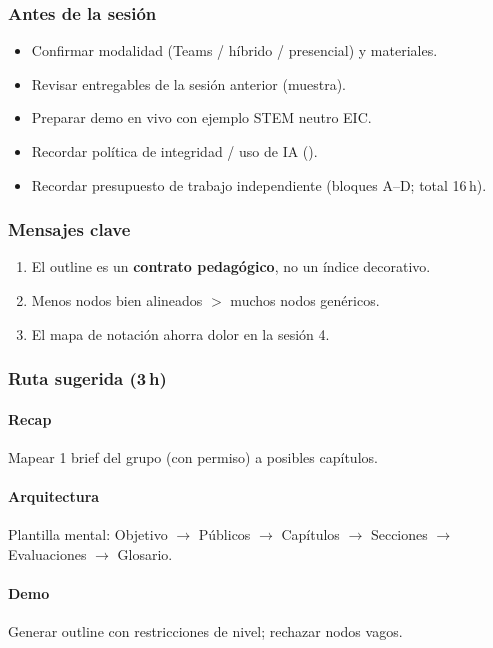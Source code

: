\subsubsection*{Antes de la sesión}
\begin{itemize}
\item[$\square$] Confirmar modalidad (Teams / híbrido / presencial) y materiales.
\item[$\square$] Revisar entregables de la sesión anterior (muestra).
\item[$\square$] Preparar demo en vivo con ejemplo STEM neutro EIC.
\item[$\square$] Recordar política de integridad / uso de IA (\ceddie).
\item[$\square$] Recordar presupuesto de trabajo independiente (bloques A--D; total 16\,h).
\end{itemize}

\subsubsection*{Mensajes clave}
\begin{enumerate}
\item El outline es un \textbf{contrato pedagógico}, no un índice decorativo.
\item Menos nodos bien alineados $>$ muchos nodos genéricos.
\item El mapa de notación ahorra dolor en la sesión 4.
\end{enumerate}

\subsubsection*{Ruta sugerida (3\,h)}
\paragraph{Recap} Mapear 1 brief del grupo (con permiso) a posibles capítulos.
\paragraph{Arquitectura} Plantilla mental: Objetivo $\rightarrow$ Públicos $\rightarrow$ Capítulos $\rightarrow$ Secciones $\rightarrow$ Evaluaciones $\rightarrow$ Glosario.
\paragraph{Demo} Generar outline con restricciones de nivel; rechazar nodos vagos.
